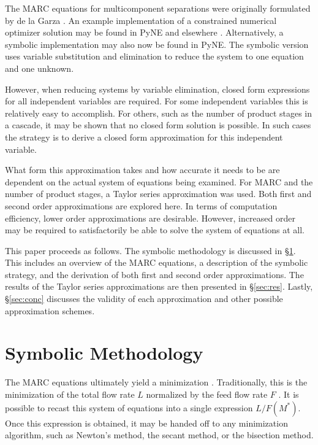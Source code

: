 \documentclass{ansconf}
\begin{document}
The MARC equations for multicomponent separations were originally formulated 
by de la Garza \cite{DelaGarza1969}.
An example implementation of a constrained numerical optimizer solution may be 
found in PyNE and elsewhere \cite{pyne:enrichment,doi:10.1080/01496391003793884}.  
Alternatively, a symbolic implementation may also now be found in PyNE.  The symbolic
version uses variable substitution and elimination to reduce the system to one 
equation and one unknown.

However, when reducing systems by variable elimination, closed form expressions for 
all independent variables are required.  For some independent variables this is 
relatively easy to accomplish. For others, such as the number of product stages in
a cascade, it may be shown that no closed form solution is possible.  In such cases 
the strategy is to derive a closed form approximation for this independent variable.

What form this approximation takes and how accurate it needs to be are dependent on 
the actual system of equations being examined.  For MARC and the number of product
stages, a Taylor series approximation was used.  Both first and second order 
approximations are explored here.  In terms of computation efficiency, lower order 
approximations are desirable.  However, increased order may be required to 
satisfactorily be able to solve the system of equations at all.

This paper proceeds as follows.  The symbolic methodology 
is discussed in \S\ref{sec:meth}.  This includes an overview of the
MARC equations, a description of the symbolic strategy, and the
derivation of both first and second order approximations.
The results of the Taylor series approximations are then presented in \S\ref{sec:res}. 
Lastly, \S\ref{sec:conc} discusses the validity of each approximation and other
possible approximation schemes.

\section{Symbolic Methodology}
\label{sec:meth}
The MARC equations ultimately yield a minimization \cite{Wood1999}.  Traditionally, 
this is the minimization of the total flow rate $L$ normalized by the feed flow rate 
$F$ \cite{DelaGarza1969}.  It is possible to recast this system of equations 
into a single expression $L/F(M^*)$.  Once this expression is obtained, it 
may be handed off to any minimization algorithm, such as Newton's
method, the secant method, or the bisection method.  
\end{document}
